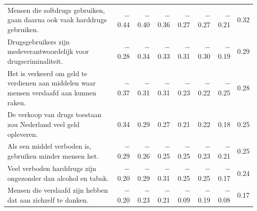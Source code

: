\begin{table}[H]
\begin{tabularx}{\linewidth}{@{}Xrrrrrrr@{}}
Mensen die softdrugs gebruiken, gaan daarna ook vaak harddrugs gebruiken. & $-$0.44 & $-$0.40 & $-$0.36 & $-$0.27 & $-$0.27 & $-$0.21 & 0.32 \\
Drugsgebruikers zijn medeverantwoordelijk voor drugscriminaliteit. & $-$0.28 & $-$0.34 & $-$0.33 & $-$0.31 & $-$0.30 & $-$0.19 & 0.29 \\
Het is verkeerd om geld te verdienen aan middelen waar mensen verslaafd aan kunnen raken. & $-$0.37 & $-$0.31 & $-$0.31 & $-$0.23 & $-$0.22 & $-$0.25 & 0.28 \\
De verkoop van drugs toestaan zou Nederland veel geld opleveren. & 0.34 & 0.29 & 0.27 & 0.21 & 0.22 & 0.18 & 0.25 \\
Als een middel verboden is, gebruiken minder mensen het. & $-$0.29 & $-$0.26 & $-$0.25 & $-$0.25 & $-$0.23 & $-$0.21 & 0.25 \\
Veel verboden harddrugs zijn ongezonder dan alcohol en tabak. & $-$0.20 & $-$0.29 & $-$0.31 & $-$0.25 & $-$0.25 & $-$0.17 & 0.24 \\
Mensen die verslaafd zijn hebben dat aan zichzelf te danken. & $-$0.20 & $-$0.23 & $-$0.21 & $-$0.09 & $-$0.19 & $-$0.08 & 0.17 \\
\bottomrule
\end{tabularx}
\end{table}
